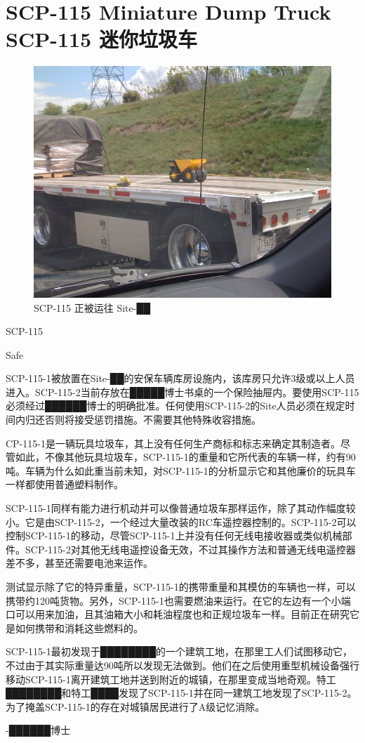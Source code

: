 \chapter[SCP-115 迷你垃圾车]{
    SCP-115 Miniature Dump Truck\\
    SCP-115 迷你垃圾车
}

\label{chap:SCP-115}

\begin{figure}[H]
    \centering
    \includegraphics[width=0.5\linewidth]{images/SCP.115.jpg}
    \caption*{SCP-115 正被运往 Site-██}
\end{figure}

SCP-115

Safe

SCP-115-1被放置在Site-██的安保车辆库房设施内，该库房只允许3级或以上人员进入。SCP-115-2当前存放在█████博士书桌的一个保险抽屉内。要使用SCP-115必须经过██████博士的明确批准。任何使用SCP-115-2的Site人员必须在规定时间内归还否则将接受惩罚措施。不需要其他特殊收容措施。

CP-115-1是一辆玩具垃圾车，其上没有任何生产商标和标志来确定其制造者。尽管如此，不像其他玩具垃圾车，SCP-115-1的重量和它所代表的车辆一样，约有90吨。车辆为什么如此重当前未知，对SCP-115-1的分析显示它和其他廉价的玩具车一样都使用普通塑料制作。

SCP-115-1同样有能力进行机动并可以像普通垃圾车那样运作，除了其动作幅度较小。它是由SCP-115-2，一个经过大量改装的RC车遥控器控制的。SCP-115-2可以控制SCP-115-1的移动，尽管SCP-115-1上并没有任何无线电接收器或类似机械部件。SCP-115-2对其他无线电遥控设备无效，不过其操作方法和普通无线电遥控器差不多，甚至还需要电池来运作。

测试显示除了它的特异重量，SCP-115-1的携带重量和其模仿的车辆也一样，可以携带约120吨货物。另外，SCP-115-1也需要燃油来运行。在它的左边有一个小端口可以用来加油，且其油箱大小和耗油程度也和正规垃圾车一样。目前正在研究它是如何携带和消耗这些燃料的。

SCP-115-1最初发现于████████的一个建筑工地，在那里工人们试图移动它，不过由于其实际重量达90吨所以发现无法做到。他们在之后使用重型机械设备强行移动SCP-115-1离开建筑工地并送到附近的城镇，在那里变成当地奇观。特工████████和特工████发现了SCP-115-1并在同一建筑工地发现了SCP-115-2。为了掩盖SCP-115-1的存在对城镇居民进行了A级记忆消除。

 -██████博士
